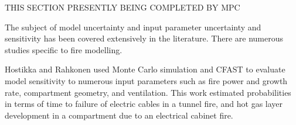 
THIS SECTION PRESENTLY BEING COMPLETED BY MPC

The subject of model uncertainty and input parameter uncertainty and sensitivity has been covered extensively in the literature.  There are numerous studies specific to fire modelling.  

Hostikka and Rahkonen \cite{Hostikka:2003a} used Monte Carlo simulation and CFAST to evaluate model sensitivity to numerous  input parameters such as fire power and growth rate, compartment geometry, and ventilation. This work estimated probabilities in terms of time to failure of electric cables in a tunnel fire, and hot gas layer development  in a compartment due to an electrical cabinet fire. 






%
% 
% 
% 
% 
% 
 
 
 
 

 
 
 
 
 



